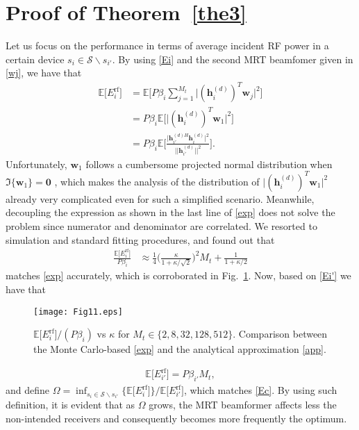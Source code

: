 \documentclass[10pt,journal,a4paper]{IEEEtran}
\begin{document}
	\section{Proof of Theorem~\ref{the3}}\label{App_B}
    Let us focus on the performance in terms of average incident RF power in a certain device $s_i\in\mathcal{S}\backslash s_{i'}$. By using \eqref{Ei} and the second MRT beamfomer given in \eqref{wj}, we have that
	\begin{align}
	\mathbb{E}\big[E_i^\mathrm{rf}\big]&=\mathbb{E}\bigg[P\beta_i\sum_{j=1}^{M_t}\big|(\mathbf{h}_i^{(d)})^T\mathbf{w}_j\big|^2\bigg]\nonumber\\
	&=P\beta_i\mathbb{E}\Big[\big|(\mathbf{h}_i^{(d)})^T\mathbf{w}_1\big|^2\Big]\nonumber\\
	&=P\beta_i\mathbb{E}\bigg[\frac{\big|\mathbf{h}_{i'}^{(d)H}\mathbf{h}_i^{(d)}\big|^2}{||\mathbf{h}_{i'}^{(d)}||^2}\bigg].\label{exp}
	\end{align}
	Unfortunately, $\mathbf{w}_1$ follows a cumbersome projected normal distribution when $\Im\{\mathbf{w}_1\}=\mathbf{0}$ \cite{Hernandez.2017}, which makes the analysis of the distribution of $\big|(\mathbf{h}_i^{(d)})^T\mathbf{w}_1\big|^2$ already very complicated even for such a simplified scenario. Meanwhile, decoupling the expression as shown in the last line of \eqref{exp} does not solve the problem since numerator and denominator are correlated. 
	We resorted to simulation and standard fitting procedures, and found out that
	\begin{align}
	\frac{\mathbb{E}\big[E_i^\mathrm{rf}\big]}{P\beta_i}&\approx\frac{1}{4}\Big(\frac{\kappa}{1+\kappa/\sqrt{2}}\Big)^2M_t+\frac{1}{1+\kappa/2}\label{app}
	\end{align}
	matches \eqref{exp} accurately, which is corroborated in Fig.~\ref{Fig11}. Now, based on \eqref{Ei'} we have that 
	\begin{figure}[t!]
		\centering 
		\texttt{[image: Fig11.eps]}
		\caption{$\mathbb{E}\big[E_i^\mathrm{rf}\big]/(P\beta_i)$ vs $\kappa$ for $M_t\in\{2,8,32,128,512\}$. Comparison between the Monte Carlo-based \eqref{exp} and the analytical approximation \eqref{app}.} 
		\label{Fig11}
	\end{figure}
	\begin{align}
	\mathbb{E}\big[E_{i'}^\mathrm{rf}\big]=P\beta_{i'}M_t,
	\end{align}
	and define $\Omega=\inf_{s_i\in\mathcal{S}\backslash s_{i'}}\big\{\mathbb{E}\big[ E_i^\mathrm{rf}\big]\big\}\big/\mathbb{E}\big[E_{i'}^\mathrm{rf}\big]$, which matches \eqref{Ec}. By using such definition, it is evident that as $\Omega$ grows, the MRT beamformer affects less the non-intended receivers and consequently becomes more frequently the optimum. 
\end{document}
